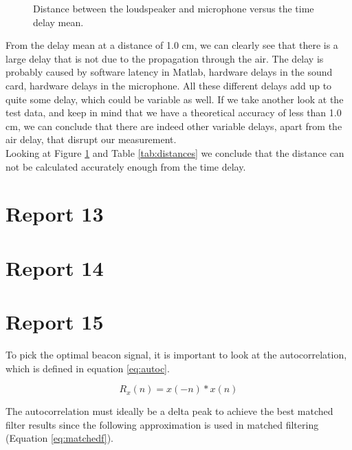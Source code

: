 \documentclass[final]{scrreprt} %
\begin{document}
\begin{figure}[H]
\centering
{}
\caption{Distance between the loudspeaker and microphone versus the time delay mean.}
\label{fig:means}
\end{figure}

From the delay mean at a distance of 1.0 cm, we can clearly see that there is a large delay that is not due to the propagation through the air.
The delay is probably caused by software latency in Matlab, hardware delays in the sound card, hardware delays in the microphone.
All these different delays add up to quite some delay, which could be variable as well.
If we take another look at the test data, and keep in mind that we have a theoretical accuracy of less than 1.0 cm, we can conclude that there are indeed other variable delays, apart from the air delay, that disrupt our measurement.\\ 
Looking at Figure \ref{fig:means} and Table \ref{tab:distances} we conclude that the distance can not be calculated accurately enough from the time delay. 


\section{Report 13}
\section{Report 14}
\section{Report 15}
To pick the optimal beacon signal, it is important to look at the autocorrelation, which is defined in equation \ref{eq:autoc}.

\begin{equation}
	R_x(n) = x(-n) * x(n)
	\label{eq:autoc}
\end{equation}

The autocorrelation must ideally be a delta peak to achieve the best matched filter results since the following approximation is used in matched filtering (Equation \ref{eq:matchedf}).
\end{document}
